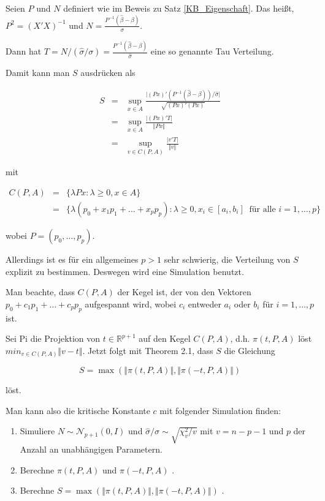 \documentclass[12pt,a4paper]{article}
\theoremstyle{definition}
\theoremstyle{definition}
\theoremstyle{definition}
\begin{document}
Seien $P$ und $N$ definiert wie im Beweis zu Satz \ref{KB_Eigenschaft}. Das heißt, $P^2 = (X'X)^{-1}$ und $N=\frac{P^{-1}(\hat{\beta}-\beta)}{\sigma}$.

Dann hat $T=N/(\hat{\sigma} /\sigma)=\frac{P^{-1}(\hat{\beta}-\beta)}{\hat{\sigma}}$ eine so genannte \gls{Tau} Verteilung. 

Damit kann man $S$ ausdrücken als

\begin{eqnarray*}
S &=& \sup_{x \in A} \frac{\vert(Px)'(P^{-1} (\hat{\beta}-\beta)) / \hat{\sigma} \vert}{\sqrt{(Px)'(Px)}}\\
&=& \sup_{x \in A} \frac{\vert (Px)' T \vert}{\Vert Px \Vert} \\
&=& \sup_{v \in C(P,A)} \frac{\vert v'T \vert}{\Vert v \Vert}
\end{eqnarray*}

mit 

\begin{eqnarray*}
C(P,A) &=& \{ \lambda P x : \lambda \geq 0, x \in A \} \\
&=& \{ \lambda (p_0+x_1 p_1 + \ldots +x_p p_p) : \lambda \geq 0, x_i \in [a_i,b_i] ~ \text{ für alle } i=1,\ldots,p \}
\end{eqnarray*}

wobei $P=(p_0, \ldots, p_p)$. 

Allerdings ist es für ein allgemeines $p>1$ sehr schwierig, die Verteilung von $S$ explizit zu bestimmen. Deswegen wird eine Simulation benutzt.

Man beachte, dass $C(P,A)$ der Kegel ist, der von den Vektoren $p_0+c_1 p_1 + \ldots + c_p p_p $ aufgespannt wird, wobei $c_i$ entweder $a_i$ oder $b_i$ für $i=1,\ldots,p$ ist. 

Sei \gls{Pi} die Projektion von $t \in \mathbb{R}^{p+1}$ auf den Kegel $C(P,A)$, d.h. $\pi(t,P,A)$ löst $ min_{v \in C(P,A)} \Vert v-t \Vert$. Jetzt folgt mit \cite{Naiman87} Theorem 2.1, dass $S$ die Gleichung

\begin{equation*}
S=\max(\Vert \pi(t,P,A) \Vert, \Vert \pi(-t,P,A) \Vert)
\end{equation*}
 
löst. 

Man kann also die kritische Konstante $c$ mit folgender Simulation finden:

\begin{enumerate}
\item Simuliere $N \sim \mathscr{N}_{p+1}(0,I)$ und $\hat{\sigma}/\sigma\sim\sqrt{\chi_v^2/v}$ mit $v=n-p-1$ und $p$ der Anzahl an unabhängigen Parametern.
\item Berechne $\pi(t,P,A)$ und $\pi(-t,P,A)$ .
\item Berechne $S=\max(\Vert \pi(t,P,A) \Vert, \Vert \pi(-t,P,A) \Vert)$ .
\end{enumerate}
\end{document}

